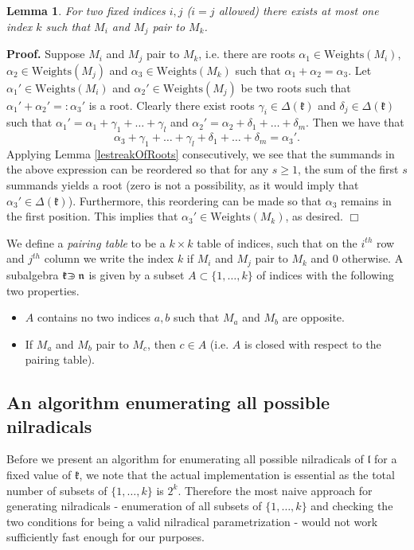 \documentclass[12pt]{report}
\newtheorem{lemma}[theo]{Lemma}
\newenvironment{proof}[1][]{ \textbf{Proof#1. }}{$\Box$\medskip}
\newcommand{\kk}{\mathfrak{k}}
\newcommand{\nn}{\mathfrak{n}}
\newcommand{\lL}{\mathfrak{l}}
\newcommand{\weights}{\mathrm{Weights}}
\def\crplus{\hbox{$\supset${\raise1.05pt\hbox{\kern -0.60em ${\scriptscriptstyle +}$}}\ }}
\begin{document}
\begin{lemma}
For two fixed indices $i,j$ ($i=j$ allowed) there exists at most one index $k$ such that $M_i$ and $M_j$ pair to $M_k$. 
\end{lemma}
\begin{proof}
Suppose $M_i$ and $M_j$ pair to $M_k$, i.e. there are roots $\alpha_1\in \weights( M_i)$, $\alpha_2\in\weights(M_j)$ and $\alpha_3\in\weights(M_k)$ such that $\alpha_1+\alpha_2=\alpha_3$. Let $\alpha_1'\in \weights(M_i)$ and $\alpha_2'\in \weights (M_j)$ be two roots such that $\alpha_1'+\alpha_2'=:\alpha_3'$ is a root. Clearly there exist roots $\gamma_i\in\Delta(\kk)$ and $\delta_j\in\Delta(\kk)$ such that $\alpha_1'=\alpha_1+\gamma_1+\dots +\gamma_l$ and $\alpha_2'=\alpha_2+\delta_1+\dots +\delta_m$. Then we have that
\[
\alpha_3+\gamma_1+\dots +\gamma_l+\delta_1+\dots +\delta_m=\alpha_3'.
\]
Applying Lemma \ref{lestreakOfRoots} consecutively, we see that the summands in the above expression can be reordered so that for any $s\geq 1$, the sum of the first $s$ summands yields a root (zero is not a possibility, as it would imply that $\alpha_3'\in \Delta(\kk)$). Furthermore, this reordering can be made so that $\alpha_3$ remains in the first position. This implies that ${\alpha_3'}\in \weights( M_k)$, as desired. 
\end{proof}

We define a \emph{pairing table} to be a $k\times k$ table of indices, such that on the $i^{th}$ row and $j^{th}$ column we write the index $k$  if $M_i$ and $M_j$ pair to $M_k$ and 0 otherwise. A subalgebra $\kk\crplus\nn$ is given by a subset $A\subset\{1,\dots,k\}$ of indices %
with the following two properties. 
\begin{itemize}
\item $A$ contains no two indices $a,b$ such that $M_{a}$ and $M_{b}$ are opposite. 
\item If $M_{a}$ and $M_{b}$ pair to $M_c$, then $c\in A$ (i.e. $A$ is closed with respect to the pairing table).
\end{itemize}
\subsection{An algorithm enumerating all possible nilradicals}\label{secEnumerateAllNilradicals}
Before we present an algorithm for enumerating all possible nilradicals of $\lL$ for a fixed value of $\kk$, we note that the actual implementation is essential as the total number of subsets of $\{1,\dots,k\} $ is $2^k$. Therefore the most naive approach for generating nilradicals - enumeration of all subsets of $\{1,\dots,k\} $ and checking the two conditions for being a valid nilradical parametrization - would not work sufficiently fast enough for our purposes.
\end{document}
